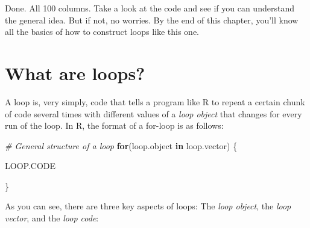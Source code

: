 \documentclass[]{book}
\newenvironment{Shaded}{\begin{snugshade}}{\end{snugshade}}
\newcommand{\KeywordTok}[1]{\textcolor[rgb]{0.13,0.29,0.53}{\textbf{#1}}}
\newcommand{\DecValTok}[1]{\textcolor[rgb]{0.00,0.00,0.81}{#1}}
\newcommand{\StringTok}[1]{\textcolor[rgb]{0.31,0.60,0.02}{#1}}
\newcommand{\CommentTok}[1]{\textcolor[rgb]{0.56,0.35,0.01}{\textit{#1}}}
\newcommand{\OtherTok}[1]{\textcolor[rgb]{0.56,0.35,0.01}{#1}}
\newcommand{\ControlFlowTok}[1]{\textcolor[rgb]{0.13,0.29,0.53}{\textbf{#1}}}
\newcommand{\OperatorTok}[1]{\textcolor[rgb]{0.81,0.36,0.00}{\textbf{#1}}}
\newcommand{\NormalTok}[1]{#1}
\theoremstyle{definition}
\theoremstyle{definition}
\theoremstyle{remark}
\begin{document}
\begin{Shaded}
\end{Shaded}

Done. All 100 columns. Take a look at the code and see if you can
understand the general idea. But if not, no worries. By the end of this
chapter, you'll know all the basics of how to construct loops like this
one.

\section{What are loops?}\label{what-are-loops}

A loop is, very simply, code that tells a program like R to repeat a
certain chunk of code several times with different values of a
\emph{loop object} that changes for every run of the loop. In R, the
format of a for-loop is as follows:

\begin{Shaded}
\begin{Highlighting}[]
\CommentTok{# General structure of a loop}
\ControlFlowTok{for}\NormalTok{(loop.object }\ControlFlowTok{in}\NormalTok{ loop.vector) \{}

\NormalTok{  LOOP.CODE}

\NormalTok{  \}}
\end{Highlighting}
\end{Shaded}

As you can see, there are three key aspects of loops: The \emph{loop
object}, the \emph{loop vector}, and the \emph{loop code}:
\end{document}
